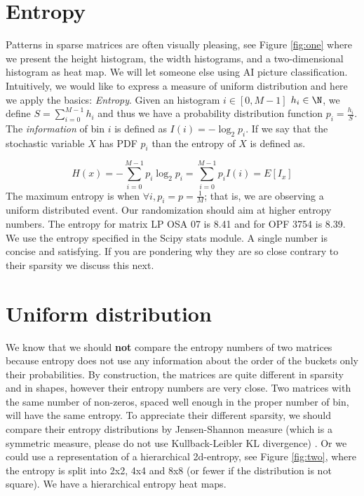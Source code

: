 \documentclass[manuscript,screen]{acmart}
\begin{document}
\section{Entropy}
\label{sec:entropy}
Patterns in sparse matrices are often visually pleasing, see Figure
\ref{fig:one} where we present the height histogram, the width
histograms, and a two-dimensional histogram as heat map. We will let
someone else using AI picture classification. Intuitively, we would
like to express a measure of uniform distribution and here we apply
the basics: {\em Entropy}. Given an histogram $i\in[0,M-1]$ $h_i \in
\N$, we define $S =\sum_{i=0}^{M-1}h_i$ and thus we have a probability
distribution function $p_i = \frac{h_i}{S}$. The {\em information} of
bin $i$ is defined as $I(i) = -\log_2 p_i$. If we say that the
stochastic variable $X$ has PDF $p_i$ than the entropy of $X$ is
defined as.

\begin{equation}
  \label{eq:entropy}
  H(x) = -\sum_{i=0}^{M-1} p_i\log_2p_i = \sum_{i=0}^{M-1}p_i I(i) =
  E[I_x]
\end{equation}
The maximum entropy is when $\forall i, p_i = p = \frac{1}{M}$; that
is, we are observing a uniform distributed event.  Our
randomization should aim at higher entropy numbers. The entropy for
matrix LP OSA 07 is 8.41 and for OPF 3754 is 8.39. We use the entropy
specified in the Scipy stats module.  A single number is concise and
satisfying. If you are pondering why they are so close contrary to
their sparsity we discuss this next.


\section{Uniform distribution}
\label{sec:uniform}
We know that we should {\bf not} compare the entropy numbers of two
matrices because entropy does not use any information about the order
of the buckets only their probabilities. By construction, the matrices
are quite different in sparsity and in shapes, however their entropy
numbers are very close.  Two matrices with the same number of
non-zeros, spaced well enough in the proper number of bin, will have
the same entropy. To appreciate their different sparsity, we should
compare their entropy distributions by Jensen-Shannon measure (which
is a symmetric measure, please do not use Kullback-Leibler KL
divergence) \cite{dalberto2012nonparametric}. Or we could use a representation of a hierarchical
2d-entropy, see Figure \ref{fig:two}, where the entropy is split into
2x2, 4x4 and 8x8 (or fewer if the distribution is not square). We have
a hierarchical entropy heat maps.
\end{document}
